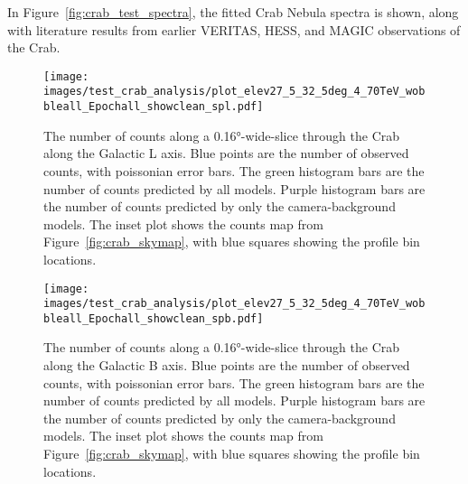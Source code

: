   In Figure~\ref{fig:crab_test_spectra}, the fitted Crab Nebula spectra is shown, along with literature results from earlier VERITAS, HESS, and MAGIC observations of the Crab.
  
  \begin{figure}[h]
    \centering
    \texttt{[image: images/test\_crab\_analysis/plot\_elev27\_5\_32\_5deg\_4\_70TeV\_wobbleall\_Epochall\_showclean\_spl.pdf]}
    \caption[Crab Profile along Galactic L]
    {
      The number of counts along a \ang{0.16}-wide-slice through the Crab along the Galactic L axis.
      Blue points are the number of observed counts, with poissonian error bars.
      The green histogram bars are the number of counts predicted by all models.
      Purple histogram bars are the number of counts predicted by only the camera-background models.
      The inset plot shows the counts map from Figure~\ref{fig:crab_skymap}, with blue squares showing the profile bin locations.
    }
    \label{fig:crab_profile_l}
  \end{figure}

  \begin{figure}[h]
    \centering
    \texttt{[image: images/test\_crab\_analysis/plot\_elev27\_5\_32\_5deg\_4\_70TeV\_wobbleall\_Epochall\_showclean\_spb.pdf]}
    \caption[Crab Profile along Galactic B]
    {
      The number of counts along a \ang{0.16}-wide-slice through the Crab along the Galactic B axis.
      Blue points are the number of observed counts, with poissonian error bars.
      The green histogram bars are the number of counts predicted by all models.
      Purple histogram bars are the number of counts predicted by only the camera-background models.
      The inset plot shows the counts map from Figure~\ref{fig:crab_skymap}, with blue squares showing the profile bin locations.
    }
    \label{fig:crab_profile_b}
  \end{figure}
    
